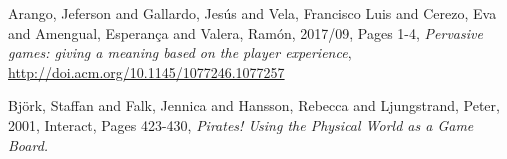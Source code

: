 %
%
%
\begin{thebibliography}{1}

  Arango, Jeferson and Gallardo, Jesús and Vela, Francisco Luis and Cerezo, Eva 
and Amengual, Esperança and Valera, Ramón,
  2017/09,
  Pages 1-4,
  \emph{Pervasive games: giving a meaning based on the player experience},
  \url{http://doi.acm.org/10.1145/1077246.1077257}
  
  Bj{\"o}rk, Staffan and Falk, Jennica and Hansson, Rebecca and Ljungstrand, 
Peter,
  2001,
  Interact, Pages 423-430,
  \emph{Pirates! Using the Physical World as a Game Board.}

\end{thebibliography}
